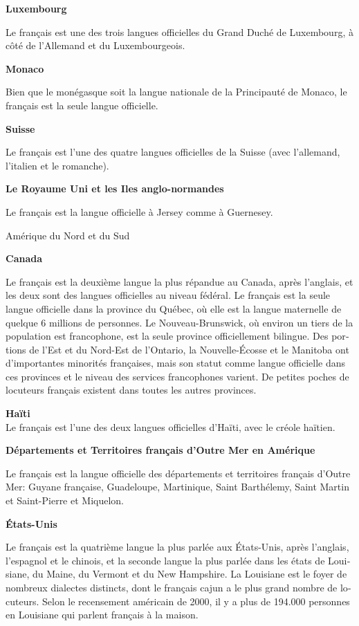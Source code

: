 \begin{french}
\begin{multicols}{2}
{\bf Luxembourg}

Le français est une des trois langues officielles du Grand Duché de
Luxembourg, à côté de l'Allemand et du Luxembourgeois.

{\bf Monaco}

Bien que le monégasque soit la langue nationale de la Principauté de
Monaco, le français est la seule langue officielle.

{\bf Suisse}

Le français est l'une des quatre langues officielles de la
Suisse (avec l'allemand, l'italien et le romanche).

{\bf Le Royaume Uni et les Iles  anglo-normandes}

Le français est la langue officielle à Jersey comme à Guernesey.

\begin{center}
{\sc Amérique du Nord et du Sud}
\end{center}

{\bf Canada}

Le français est la deuxième langue la plus répandue au Canada, après
l'anglais, et les deux sont des langues officielles au niveau
fédéral. Le français est la seule langue officielle dans la province
du Québec, où elle est la langue maternelle de quelque 6 millions de
personnes. Le Nouveau-Brunswick, où environ un tiers de la population
est francophone, est la seule province officiellement bilingue. Des
portions de l'Est et du Nord-Est de l'Ontario, la
Nouvelle-Écosse et le Manitoba ont d'importantes minorités françaises,
mais son statut comme langue officielle dans ces provinces et le
niveau des services francophones varient. De petites poches de
locuteurs français existent dans toutes les autres provinces.

{\bf Haïti}\\
Le français est l'une des deux langues officielles d'Haïti, avec le créole haïtien.

{\bf Départements et Territoires français d'Outre Mer en Amérique}

Le français est la langue officielle des départements et territoires
français d'Outre Mer: Guyane française, Guadeloupe,
Martinique, Saint Barthélemy, Saint Martin et Saint-Pierre et
Miquelon.

{\bf États-Unis}

Le français est la quatrième langue la plus parlée aux États-Unis,
après l'anglais, l'espagnol et le chinois, et la
seconde langue la plus parlée dans les états de Louisiane, du Maine,
du Vermont et du New Hampshire. La Louisiane est le foyer de nombreux
dialectes distincts, dont le français cajun a le plus grand nombre de
locuteurs. Selon le recensement américain de 2000, il y a plus de
194.000 personnes en Louisiane qui parlent français à la maison.


\end{multicols}
\end{french}
